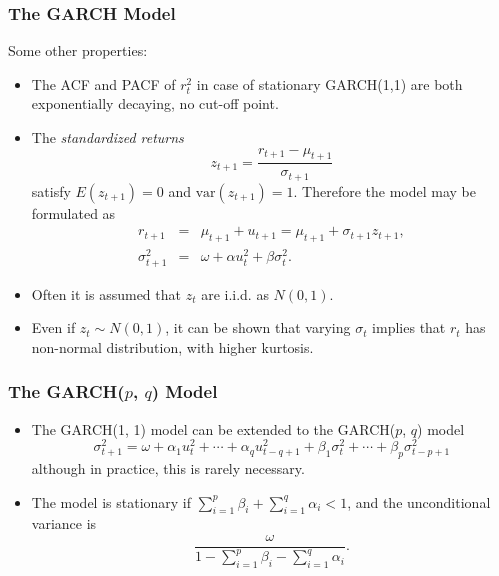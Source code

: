 \begin{frame}%

\frametitle{The GARCH Model}

Some other properties:

\begin{itemize}
\item The ACF and PACF of $r_{t}^{2}$ in case of stationary GARCH(1,1) are
both exponentially decaying, no cut-off point.

\item The \emph{\color{red}standardized returns}
\begin{equation*}
z_{t+1}=\frac{r_{t+1}-\mu _{t+1}}{\sigma _{t+1}}
\end{equation*}%
satisfy $E(z_{t+1})=0$ and $\text{var}(z_{t+1})=1$. Therefore the
model may be formulated as%
\begin{eqnarray*}
r_{t+1} &=&\mu _{t+1}+u_{t+1}=\mu _{t+1}+\sigma _{t+1}z_{t+1}, \\
\sigma _{t+1}^{2} &=&\omega +\alpha u_{t}^{2}+\beta \sigma _{t}^{2}.
\end{eqnarray*}

\item Often it is assumed that $z_{t}$ are i.i.d. as $N(0,1)$.

\item Even if $z_{t}\sim N(0,1)$, it can be shown that varying $\sigma _{t}$
implies that $r_{t}$ has non-normal distribution, with higher kurtosis.
\end{itemize}

\end{frame}%

\begin{frame}%

\frametitle{The GARCH($p$, $q$) Model}

\begin{itemize}
\item The GARCH(1, 1) model can be extended to the GARCH($p$, $q$) model
\begin{equation*}
\sigma _{t+1}^{2}=\omega +\alpha_1 u_{t}^{2}+\cdots+\alpha_q u_{t-q+1}^{2} +\beta_1 \sigma _{t}^{2}+\cdots+\beta_p \sigma _{t-p+1}^{2}
\end{equation*}
 although in practice, this is rarely necessary.
\item The model is stationary if $\sum_{i=1}^p\beta_i+\sum_{i=1}^q\alpha_i<1$, and the unconditional variance is
\[
\frac{\omega}{1-\sum_{i=1}^p\beta_i-\sum_{i=1}^q\alpha_i}.
\]

\end{itemize}

\end{frame}%

